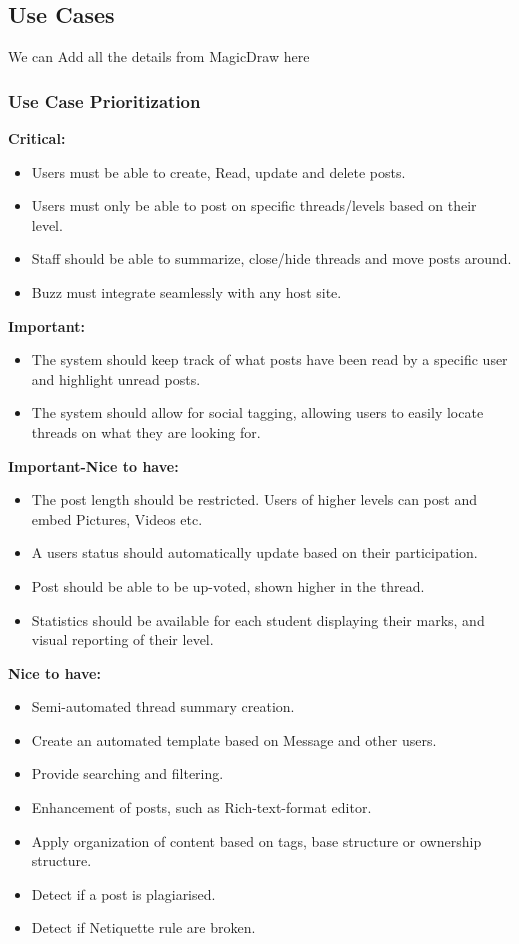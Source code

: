 \documentclass[12pt]{article}
\begin{document}
\subsection{Use Cases}
We can Add all the details from MagicDraw here

\subsubsection{Use Case Prioritization}
\textbf{Critical:}
\begin{itemize}
\item Users must be able to create, Read, update and delete posts.
\item Users must only be able to post on specific threads/levels based on their level.
\item Staff should be able to summarize, close/hide threads and move posts around.
\item Buzz must integrate seamlessly with any host site.
\end{itemize}
\textbf{Important:}
\begin{itemize}
\item The system should keep track of what posts have been read by a specific user and highlight unread posts.
\item The system should allow for social tagging, allowing users to easily locate threads on what they are looking for.
\end{itemize}
\textbf{Important-Nice to have:} 
\begin{itemize}
\item The post length should be restricted. Users of higher levels can post and embed Pictures, Videos etc.
\item A users status should automatically update based on their participation.
\item Post should be able to be up-voted, shown higher in the thread.
\item Statistics should be available for each student displaying their marks, and visual reporting of their level.
\end{itemize}
\newpage
\textbf{Nice to have:}
\begin{itemize}
\item Semi-automated thread summary creation.
\item Create an automated template based on Message and other users.
\item Provide searching and filtering.
\item Enhancement of posts, such as Rich-text-format editor.
\item Apply organization of content based on tags, base structure or ownership structure.
\item Detect if a post is plagiarised.
\item Detect if Netiquette rule are broken.
\end{itemize}
\end{document}
